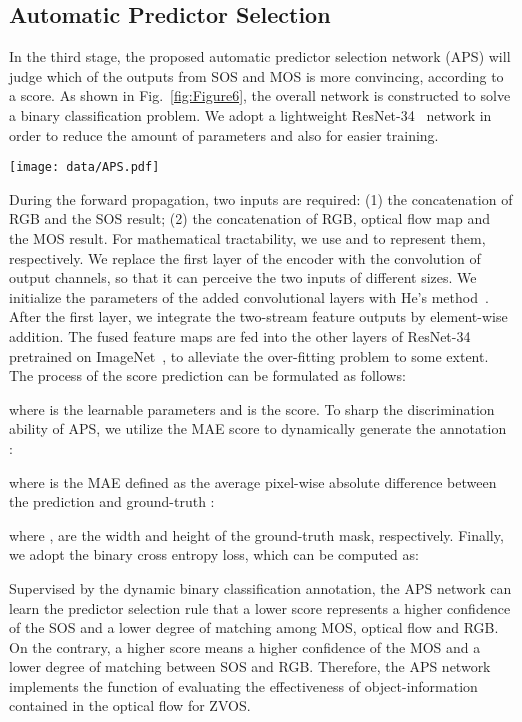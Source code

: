 \documentclass[sigconf]{acmart}
\begin{document}
\subsection{Automatic Predictor Selection}
In the third stage, the proposed automatic predictor selection network (APS) will judge which of the outputs from SOS and MOS is more convincing, according to a score. As shown in Fig.~\ref{fig:Figure6}, the overall network is constructed to solve a binary classification problem. We adopt a lightweight ResNet-34~\cite{Resnet} network in order to reduce the amount of parameters and also for easier training.
\begin{figure*}
\texttt{[image: data/APS.pdf]}\\
        \centering
        \caption{The overall architecture of the automatic predictor selection network.}
\label{fig:Figure6}
\end{figure*} 
During the forward propagation, two inputs are required: (1) the concatenation of RGB and the SOS result; (2) the concatenation of RGB, optical flow map and the MOS result. For mathematical tractability, we use  and  to represent them, respectively. We replace the first layer of the encoder with the convolution of  output channels, so that it can perceive the two inputs of different sizes. 
We initialize the parameters of the added convolutional layers with He's method~\cite{PRelu}.
After the first layer, we integrate the two-stream feature outputs by element-wise addition. The fused feature maps are fed into the other layers of ResNet-34 pretrained on ImageNet~\cite{ImageNet}, to alleviate the over-fitting problem to some extent. 
The process of the score prediction can be formulated as follows:
	
where  is the learnable parameters and  is the score. To sharp the discrimination ability of APS, we utilize the MAE score to dynamically generate the annotation :

where  is the MAE defined as the average pixel-wise absolute difference between the prediction  and ground-truth :
	
where 
,  are the width
and height of the ground-truth mask, respectively. 
Finally, we adopt the binary cross entropy loss, which can be computed as:
 

Supervised by the dynamic binary classification annotation, the APS network can learn the predictor selection rule that a lower score represents a higher confidence of the SOS and a lower degree of matching among MOS, optical flow and RGB. On the contrary, a higher score means a higher confidence of the MOS and a lower degree of matching between SOS and RGB. Therefore, the APS network implements the function of evaluating the effectiveness of object-information contained in the optical flow for ZVOS.
\end{document}
